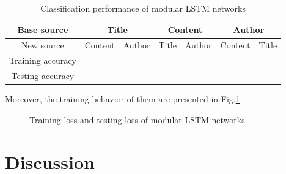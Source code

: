 \documentclass[12pt]{article}
\begin{document}
\begin{table}[!t]
\begin{center}
\caption{Classification performance of modular LSTM networks}
\label{modular_lstm_acc}
\begin{tabular}{c|cc|cc|cc}
\hline

Base source & \multicolumn{2}{c}{Title} & \multicolumn{2}{c}{Content} & \multicolumn{2}{c}{Author} \\
\hline
New source   &   Content   &   Author     &       Title  & Author                &            Content & Title \\
\hline
Training accuracy   &                   &                  &                &                           &                           & \\
Testing accuracy   &                   &                  &                &                           &                           & \\

\hline


\hline
\end{tabular}
\end{center}
\end{table}



Moreover, the training behavior of them are presented in Fig.\ref{training_loss_modular}.


\begin{figure}[!t]
\begin{center}
\end{center}
\caption{Training loss and testing loss of modular LSTM networks.}
\label{training_loss_modular}
\end{figure}










\section{Discussion}\label{discussion}
\end{document}

